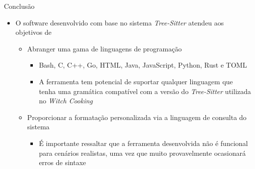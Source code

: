 \documentclass
  [ aspectratio=169,
    english,
    hyperref={citecolor=blue,colorlinks=true,linkcolor=blue,urlcolor=blue},
    brazil]
  {beamer}
\newcommand{\treesitter}{\textit{Tree-Sitter}\xspace}
\newcommand{\witchcooking}{\textit{Witch Cooking}\xspace}
\begin{document}
  \begin{frame}[fragile]{Conclusão}
    \begin{itemize}
      \item O software desenvolvido com base no sistema \treesitter atendeu aos
            objetivos de
            \begin{itemize}
              \item Abranger uma gama de linguagens de programação
                    \begin{itemize}
                      \item Bash, C, C++, Go, HTML, Java, JavaScript, Python,
                            Rust e TOML
                      \item A ferramenta tem potencial de suportar qualquer
                            linguagem que tenha uma gramática compatível com a
                            versão do \treesitter utilizada no \witchcooking
                    \end{itemize}
              \item Proporcionar a formatação personalizada via a linguagem de
                    consulta do sistema
                    \begin{itemize}
                      \item É importante ressaltar que a ferramenta
                            desenvolvida não é funcional para cenários
                            realistas, uma vez que muito provavelmente
                            ocasionará erros de sintaxe
                    \end{itemize}
            \end{itemize}
    \end{itemize}
  \end{frame}

\end{document}
